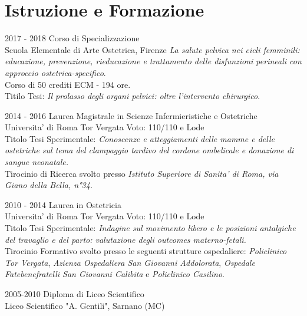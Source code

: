 \documentclass[11pt]{friggeri-cv}
\begin{document}
\vspace{-15pt}
\section{Istruzione e Formazione}
\begin{entrylist}
	\entry
	{2017 - 2018}
	{Corso di Specializzazione}
	{\\Scuola Elementale di Arte Ostetrica, Firenze}
	{\emph{La salute pelvica nei cicli femminili: educazione, prevenzione, 
    rieducazione e trattamento delle disfunzioni perineali con approccio 
    ostetrica-specifico}. \\
    Corso di 50 crediti ECM - 194 ore.\\ 
    Titilo Tesi: \emph{Il prolasso degli organi pelvici: oltre l’intervento chirurgico}.\\}

	\entry
	{2014 - 2016}
	{Laurea Magistrale in Scienze Infermieristiche e Ostetriche}
	{\\Universita' di Roma Tor Vergata}
	{Voto: 110/110 e Lode\\ Titolo Tesi Sperimentale: \emph{Conoscenze e 
	atteggiamenti delle mamme e delle ostetriche sul tema del clampaggio tardivo del 
	cordone ombelicale e donazione di sangue neonatale.} \\Tirocinio di Ricerca svolto 
	presso \textit{Istituto Superiore di Sanita' di Roma, via Giano della Bella, 
	n°34}.\\}
	
	\entry
	{2010 - 2014}
	{Laurea in Ostetricia}
	{\\Universita' di Roma Tor Vergata}
	{Voto: 110/110 e Lode\\
    Titolo Tesi Sperimentale: \emph{Indagine sul movimento libero e le posizioni 
    antalgiche del travaglio e del parto: valutazione degli outcomes materno-fetali.} \\
    Tirocinio Formativo svolto presso le seguenti strutture ospedaliere: \textit{Policlinico Tor 
    Vergata}, \textit{Azienza Ospedaliera San Giovanni Addolorata}, 
    \textit{Ospedale Fatebenefratelli San Giovanni Calibita} e \textit{Policlinico 
    Casilino}.\\}

	\entry
	{2005-2010}
	{Diploma di Liceo Scientifico}
	{\\Liceo Scientifico "A. Gentili", Sarnano (MC)}
	{\\}
\end{entrylist}
\end{document}
